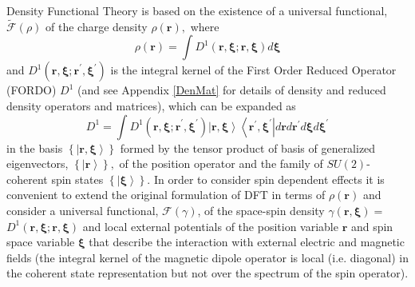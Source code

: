\documentclass[aps,preprint]{revtex4}%
\begin{document}
\bigskip Density Functional Theory is based on the existence of a universal
functional, $\mathcal{\tilde{F}}\left(  \rho\right)  $ \cite{HK} of the charge
density $\rho\left(  \mathbf{r}\right)  ,$ where
\begin{equation}
\rho\left(  \mathbf{r}\right)  =\int D^{1}\left(  \mathbf{r,\xi;r,\xi}\right)
d\mathbf{\xi}%
\end{equation}
and $D^{1}\left(  \mathbf{r,\xi;r}^{\prime}\mathbf{,\xi}^{\prime}\right)  $ is
the integral kernel of the First Order Reduced Operator (FORDO) $D^{1}$
\cite{Coleman} (and see Appendix \ref{DenMat} for details of density and
reduced density operators and matrices), which can be expanded as
\begin{equation}
D^{1}=\int D^{1}\left(  \mathbf{r,\xi;r}^{\prime}\mathbf{,\xi}^{\prime
}\right)  \left\vert \mathbf{r,\xi}\right\rangle \left\langle \mathbf{r}%
^{\prime}\mathbf{,\xi}^{\prime}\right\vert d\mathbf{r}d\mathbf{r}^{\prime
}d\mathbf{\xi}d\mathbf{\xi}^{\prime}%
\end{equation}
in the basis $\left\{  \left\vert \mathbf{r,\xi}\right\rangle \right\}  $
formed by the tensor product of basis of generalized eigenvectors, $\left\{
\left\vert \mathbf{r}\right\rangle \right\}  ,$ of the position operator and
the family of $SU(2)$-coherent spin states $\left\{  \left\vert \mathbf{\xi
}\right\rangle \right\}  $. In order to consider spin dependent effects it is
convenient to extend the original formulation of DFT in terms of $\rho\left(
\mathbf{r}\right)  $ and consider a universal functional, $\mathcal{F}\left(
\gamma\right)  $, of the space-spin density $\gamma\left(  \mathbf{r,\xi
}\right)  =$ $D^{1}\left(  \mathbf{r,\xi;r,\xi}\right)  $
\cite{weiner-trickey} and local external potentials of the position variable
$\mathbf{r}$ and spin space variable $\mathbf{\xi}$ that describe the
interaction with external electric and magnetic fields (the integral kernel of
the magnetic dipole operator is local (i.e. diagonal) in the coherent state
representation but not over the spectrum of the spin operator)$.$
\end{document}
